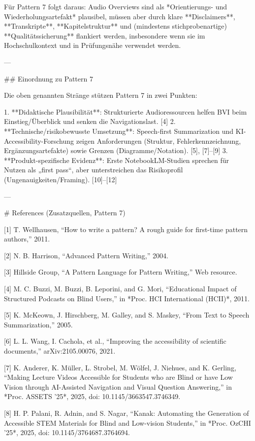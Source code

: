 Für Pattern 7 folgt daraus: Audio Overviews sind als *Orientierungs- und Wiederholungsartefakt* plausibel, müssen aber durch klare **Disclaimers**, **Transkripte**, **Kapitelstruktur** und (mindestens stichprobenartige) **Qualitätssicherung** flankiert werden, insbesondere wenn sie im Hochschulkontext und in Prüfungsnähe verwendet werden.

---

## Einordnung zu Pattern 7

Die oben genannten Stränge stützen Pattern 7 in zwei Punkten:

1. **Didaktische Plausibilität**: Strukturierte Audioressourcen helfen BVI beim Einstieg/Überblick und senken die Navigationslast. [4]
2. **Technische/risikobewusste Umsetzung**: Speech-first Summarization und KI-Accessibility-Forschung zeigen Anforderungen (Struktur, Fehlerkennzeichnung, Ergänzungsartefakte) sowie Grenzen (Diagramme/Notation). [5], [7]–[9]
3. **Produkt-spezifische Evidenz**: Erste NotebookLM-Studien sprechen für Nutzen als „first pass“, aber unterstreichen das Risikoprofil (Ungenauigkeiten/Framing). [10]–[12]

---

# References (Zusatzquellen, Pattern 7)

[1] T. Wellhausen, “How to write a pattern? A rough guide for first-time pattern authors,” 2011.

[2] N. B. Harrison, “Advanced Pattern Writing,” 2004.

[3] Hillside Group, “A Pattern Language for Pattern Writing,” Web resource.

[4] M. C. Buzzi, M. Buzzi, B. Leporini, and G. Mori, “Educational Impact of Structured Podcasts on Blind Users,” in *Proc. HCI International (HCII)*, 2011.

[5] K. McKeown, J. Hirschberg, M. Galley, and S. Maskey, “From Text to Speech Summarization,” 2005.

[6] L. L. Wang, I. Cachola, et al., “Improving the accessibility of scientific documents,” arXiv:2105.00076, 2021.

[7] K. Anderer, K. Müller, L. Strobel, M. Wölfel, J. Niehues, and K. Gerling, “Making Lecture Videos Accessible for Students who are Blind or have Low Vision through AI-Assisted Navigation and Visual Question Answering,” in *Proc. ASSETS ’25*, 2025, doi: 10.1145/3663547.3746349.

[8] H. P. Palani, R. Adnin, and S. Nagar, “Kanak: Automating the Generation of Accessible STEM Materials for Blind and Low-vision Students,” in *Proc. OzCHI ’25*, 2025, doi: 10.1145/3764687.3764694.

